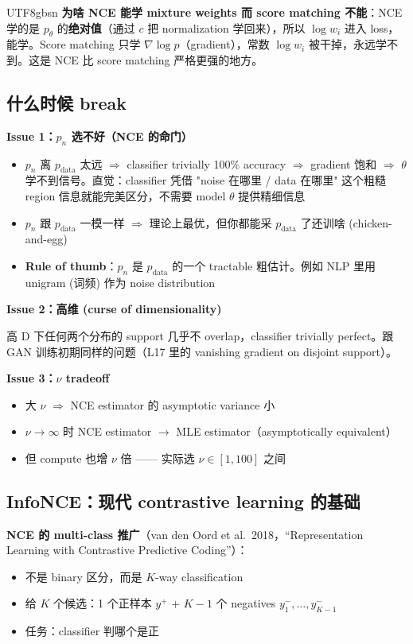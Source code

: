 \documentclass[11pt]{article}
\begin{document}
\begin{CJK}{UTF8}{gbsn}
\textbf{为啥 NCE 能学 mixture weights 而 score matching 不能}：NCE 学的是 $p_\theta$ 的\textbf{绝对值}（通过 $c$ 把 normalization 学回来），所以 $\log w_i$ 进入 loss，能学。Score matching 只学 $\nabla \log p$（gradient），常数 $\log w_i$ 被干掉，永远学不到。这是 NCE 比 score matching 严格更强的地方。

\subsection{什么时候 break}

\textbf{Issue 1：$p_n$ 选不好（NCE 的命门）}

\begin{itemize}[nosep]
  \item $p_n$ 离 $p_{\text{data}}$ 太远 $\Rightarrow$ classifier trivially 100\% accuracy $\Rightarrow$ gradient 饱和 $\Rightarrow$ $\theta$ 学不到信号。直觉：classifier 凭借 "noise 在哪里 / data 在哪里" 这个粗糙 region 信息就能完美区分，不需要 model $\theta$ 提供精细信息
  \item $p_n$ 跟 $p_{\text{data}}$ 一模一样 $\Rightarrow$ 理论上最优，但你都能采 $p_{\text{data}}$ 了还训啥 (chicken-and-egg)
  \item \textbf{Rule of thumb}：$p_n$ 是 $p_{\text{data}}$ 的一个 tractable 粗估计。例如 NLP 里用 unigram (词频) 作为 noise distribution
\end{itemize}

\textbf{Issue 2：高维 (curse of dimensionality)}

高 D 下任何两个分布的 support 几乎不 overlap，classifier trivially perfect。跟 GAN 训练初期同样的问题（L17 里的 vanishing gradient on disjoint support）。

\textbf{Issue 3：$\nu$ tradeoff}

\begin{itemize}[nosep]
  \item 大 $\nu$ $\Rightarrow$ NCE estimator 的 asymptotic variance 小
  \item $\nu \to \infty$ 时 NCE estimator $\to$ MLE estimator（asymptotically equivalent）
  \item 但 compute 也增 $\nu$ 倍 —— 实际选 $\nu \in [1, 100]$ 之间
\end{itemize}

\subsection{InfoNCE：现代 contrastive learning 的基础}

\textbf{NCE 的 multi-class 推广}（van den Oord et al.\ 2018，``Representation Learning with Contrastive Predictive Coding''）：
\begin{itemize}[nosep]
  \item 不是 binary 区分，而是 $K$-way classification
  \item 给 $K$ 个候选：1 个正样本 $y^+$ + $K-1$ 个 negatives $y_1^-, \ldots, y_{K-1}^-$
  \item 任务：classifier 判哪个是正
\end{itemize}


\end{CJK}
\end{document}
